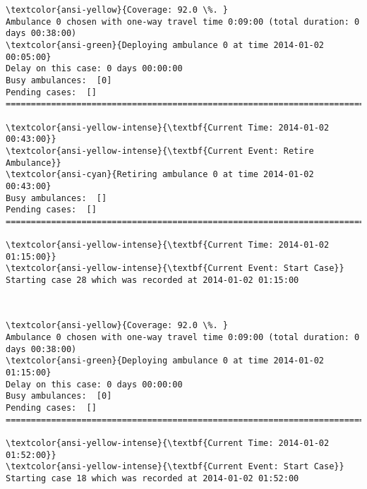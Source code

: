 \documentclass[11pt]{article}
\begin{document}
    \begin{Verbatim}[commandchars=\\\{\}]
\textcolor{ansi-yellow}{Coverage: 92.0 \%. }
Ambulance 0 chosen with one-way travel time 0:09:00 (total duration: 0 days 00:38:00)
\textcolor{ansi-green}{Deploying ambulance 0 at time 2014-01-02 00:05:00}
Delay on this case: 0 days 00:00:00
Busy ambulances:  [0]
Pending cases:  []
========================================================================

\textcolor{ansi-yellow-intense}{\textbf{Current Time: 2014-01-02 00:43:00}}
\textcolor{ansi-yellow-intense}{\textbf{Current Event: Retire Ambulance}}
\textcolor{ansi-cyan}{Retiring ambulance 0 at time 2014-01-02 00:43:00}
Busy ambulances:  []
Pending cases:  []
========================================================================

\textcolor{ansi-yellow-intense}{\textbf{Current Time: 2014-01-02 01:15:00}}
\textcolor{ansi-yellow-intense}{\textbf{Current Event: Start Case}}
Starting case 28 which was recorded at 2014-01-02 01:15:00

    \end{Verbatim}

    \begin{center}
    \end{center}
    { \hspace*{\fill} \\}
    
    \begin{Verbatim}[commandchars=\\\{\}]
\textcolor{ansi-yellow}{Coverage: 92.0 \%. }
Ambulance 0 chosen with one-way travel time 0:09:00 (total duration: 0 days 00:38:00)
\textcolor{ansi-green}{Deploying ambulance 0 at time 2014-01-02 01:15:00}
Delay on this case: 0 days 00:00:00
Busy ambulances:  [0]
Pending cases:  []
========================================================================

\textcolor{ansi-yellow-intense}{\textbf{Current Time: 2014-01-02 01:52:00}}
\textcolor{ansi-yellow-intense}{\textbf{Current Event: Start Case}}
Starting case 18 which was recorded at 2014-01-02 01:52:00

    \end{Verbatim}

    \begin{center}
    \end{center}
    { \hspace*{\fill} \\}
    
\end{document}
